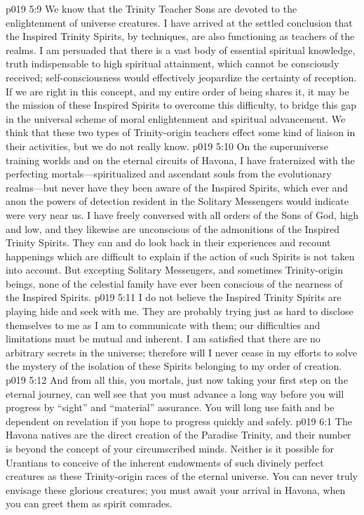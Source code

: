 \vs p019 5:9 We know that the Trinity Teacher Sons are devoted to the  enlightenment of universe creatures. I have arrived at the settled conclusion that the Inspired Trinity Spirits, by  techniques, are also functioning as teachers of the realms. I am persuaded that there is a vast body of essential spiritual knowledge, truth indispensable to high spiritual attainment, which cannot be consciously received; self\hyp{}consciousness would effectively jeopardize the certainty of reception. If we are right in this concept, and my entire order of being shares it, it may be the mission of these Inspired Spirits to overcome this difficulty, to bridge this gap in the universal scheme of moral enlightenment and spiritual advancement. We think that these two types of Trinity\hyp{}origin teachers effect some kind of liaison in their activities, but we do not really know.
\vs p019 5:10 On the superuniverse training worlds and on the eternal circuits of Havona, I have fraternized with the perfecting mortals---spiritualized and ascendant souls from the evolutionary realms---but never have they been aware of the Inspired Spirits, which ever and anon the powers of detection resident in the Solitary Messengers would indicate were very near us. I have freely conversed with all orders of the Sons of God, high and low, and they likewise are unconscious of the admonitions of the Inspired Trinity Spirits. They can and do look back in their experiences and recount happenings which are difficult to explain if the action of such Spirits is not taken into account. But excepting Solitary Messengers, and sometimes Trinity\hyp{}origin beings, none of the celestial family have ever been conscious of the nearness of the Inspired Spirits.
\vs p019 5:11 I do not believe the Inspired Trinity Spirits are playing hide and seek with me. They are probably trying just as hard to disclose themselves to me as I am to communicate with them; our difficulties and limitations must be mutual and inherent. I am satisfied that there are no arbitrary secrets in the universe; therefore will I never cease in my efforts to solve the mystery of the isolation of these Spirits belonging to my order of creation.
\vs p019 5:12 And from all this, you mortals, just now taking your first step on the eternal journey, can well see that you must advance a long way before you will progress by “sight” and “material” assurance. You will long use faith and be dependent on revelation if you hope to progress quickly and safely.
\vs p019 6:1 The Havona natives are the direct creation of the Paradise Trinity, and their number is beyond the concept of your circumscribed minds. Neither is it possible for Urantians to conceive of the inherent endowments of such divinely perfect creatures as these Trinity\hyp{}origin races of the eternal universe. You can never truly envisage these glorious creatures; you must await your arrival in Havona, when you can greet them as spirit comrades.
